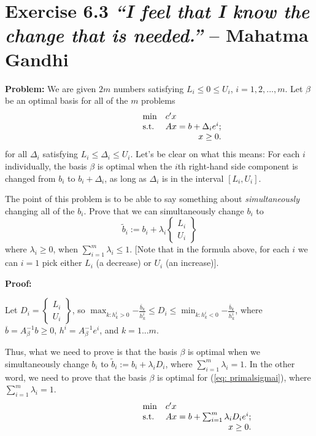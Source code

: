 \section{Exercise 6.3 \emph{``I feel that I know the change that is needed.''} -- Mahatma Gandhi}
\textbf{Problem:} We are given $2m$ numbers satisfying $L_i\leq{}0\leq{}U_i$, $i=1,2,...,m$. Let $\beta$ be an optimal basis for all of the $m$ problems
\begin{equation}
\label{eq: primali}
  \begin{array}{lrcll}
    \min
    & \multicolumn{4}{l}{c'x} \\
    \text{s.t.}
    & Ax=b+\Delta_ie^i;\\
    & x\geq0.
  \end{array}
\end{equation}
for all $\Delta_i$ satisfying $L_i\leq{}\Delta_i\leq{}U_i$. Let’s be clear on what this means: For each $i$ individually, the basis $\beta$ is optimal when the $i$th right-hand side component is changed from $b_i$ to $b_i+\Delta_i$, as long as $\Delta_i$ is in the interval $[L_i,U_i]$. 

The point of this problem is to be able to say something about \textit{simultaneously} changing all of the $b_i$. Prove that we can simultaneously change $b_i$ to
\[
\tilde{b}_i:=b_i+\lambda_i \left\lbrace \begin{array}{c} L_i \\ U_i \end{array}\right\rbrace
\]
where $\lambda_i\geq0$, when $\sum^{m}_{i=1} \lambda_i \leq1$. [Note that in the formula above, for each $i$ we can $i=1$ pick either $L_i$ (a decrease) or $U_i$ (an increase)].

\textbf{Proof:}

Let $D_i=\left\lbrace \begin{array}{c} L_i \\ U_i \end{array}\right\rbrace$, so $\max_{k:h^i_k>0}{-\frac{\overline{b}_k}{h^i_k}}\leq{}D_i\leq{}\min_{k:h^i_k<0}{-\frac{\overline{b}_k}{h^i_k}}$, where  $\overline{b}=A^{-1}_{\beta}b\geq0$, $h^i=A^{-1}_{\beta}e^i$, and $k=1...m$.

Thus, what we need to prove is that the basis $\beta$ is optimal when we simultaneously change $b_i$ to $\tilde{b}_i:=b_i+\lambda_iD_i$, where $\sum^{m}_{i=1}\lambda_i=1$. In the other word, we need to prove that the basis $\beta$ is optimal for (\ref{eq: primalsigmai}), where $\sum^{m}_{i=1}\lambda_i=1$.
\begin{equation}
\label{eq: primalsigmai}
  \begin{array}{lrcll}
    \min
    & \multicolumn{4}{l}{c'x} \\
    \text{s.t.}
    & Ax=b+\sum^{m}_{i=1}\lambda_i{}D_i{}e^i;\\
    & x\geq0.
  \end{array}
\end{equation}

